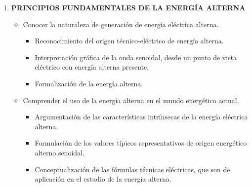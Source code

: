 \documentclass[a4paper,12pt]{article}
\begin{document}
\begin{enumerate}[label=\textbf{\arabic*.}, leftmargin=*]
    \item \textbf{PRINCIPIOS FUNDAMENTALES DE LA ENERGÍA ALTERNA}
    \begin{itemize}[leftmargin=*, nosep]
        \item Conocer la naturaleza de generación de energía eléctrica alterna.
        \begin{itemize}
            \item Reconocimiento del origen técnico-eléctrico de energía alterna.
            \item Interpretación gráfica de la onda senoidal, desde un punto de vista eléctrico con energía alterna presente.
            \item Formalización de la energía alterna.
        \end{itemize}
        \item Comprender el uso de la energía alterna en el mundo energético actual.
        \begin{itemize}
            \item Argumentación de las características intrínsecas de la energía eléctrica alterna.
            \item Formulación de los valores típicos representativos de origen energético alterno senoidal.
            \item Conceptualización de las fórmulas técnicas eléctricas, que son de aplicación en el estudio de la energía alterna.
        \end{itemize}
    \end{itemize}
\end{enumerate}
\end{document}
